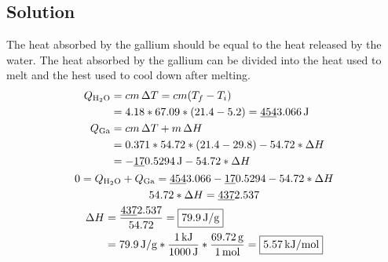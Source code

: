 \documentclass[10pt]{article}
\newcommand{\U}[1]{\underline{#1}}
\begin{document}
        \subsection{Solution}
            The heat absorbed by the gallium should be equal to the heat released by the water.
            The heat absorbed by the gallium can be divided into the heat used to melt and the hest used to cool down after melting.
            \begin{gather}
                \begin{align}
                    Q_{\rm H_2O}    &=  cm\,\Delta T
                        =   cm(T_f - T_i)\\
                        &=  4.18 * 67.09 * (21.4 - 5.2)
                        =   \U{454}3.066\,\unit{\joule}\\
                    Q_{\rm Ga}  &=  cm\,\Delta T + m\,\Delta H\\
                        &=  0.371 * 54.72 * (21.4 - 29.8) - 54.72 * \Delta H\\
                        &=  -\U{17}0.5294\,\unit{\joule} - 54.72 * \Delta H
                \end{align}\\
                0   =   Q_{\rm H_2O} + Q_{\rm Ga}
                    =   \U{454}3.066 - \U{17}0.5294 - 54.72 * \Delta H\\
                54.72 * \Delta H    =   \U{437}2.537\\
                \begin{align}
                    \Delta H    &=  \frac{\U{437}2.537}{54.72}
                        =   \boxed{79.9\,\unit{\joule/\gram}}\\
                        &=  79.9\,\unit{\joule/\gram} * \frac{1\,\unit{\kilo\joule}}{1000\,\unit{\joule}} * \frac{69.72\,\unit{\gram}}{1\,\unit{\mole}}
                        =   \boxed{5.57\,\unit{\kilo\joule/\mole}}
                \end{align}
            \end{gather}
    
    \pagebreak
    \tableofcontents
\end{document}
